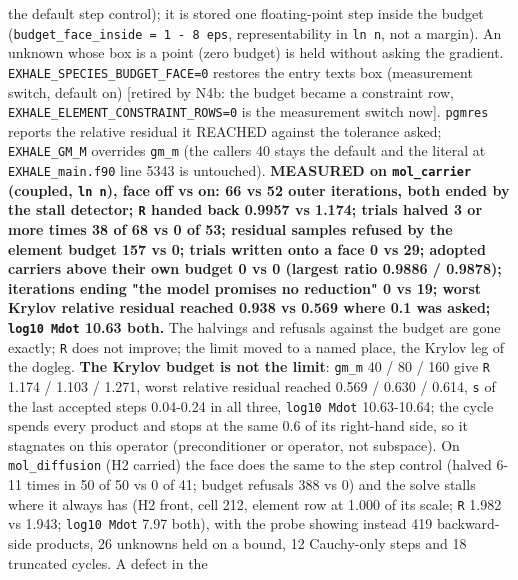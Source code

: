 \documentclass[english,a4paper]{my_memo}
\begin{document}
\begin{itemize}
  the default step control); it is stored one floating-point step inside
  the budget (\texttt{budget\_face\_inside\ =\ 1\ -\ 8\ eps}, representability in \texttt{ln\ n},
  not a margin). An unknown whose box is a point (zero budget) is held
  without asking the gradient. \texttt{EXHALE\_SPECIES\_BUDGET\_FACE=0} restores the
  entry text\textquotesingle s box (measurement switch, default on) {[}retired by N4b: the
  budget became a constraint row, \texttt{EXHALE\_ELEMENT\_CONSTRAINT\_ROWS=0} is the
  measurement switch now{]}. \texttt{pgmres} reports the
  relative residual it REACHED against the tolerance asked; \texttt{EXHALE\_GM\_M}
  overrides \texttt{gm\_m} (the caller\textquotesingle s 40 stays the default and the literal at
  \texttt{EXHALE\_main.f90} line 5343 is untouched). \textbf{MEASURED on \texttt{mol\_carrier}
  (coupled, \texttt{ln\ n}), face off vs on: 66 vs 52 outer iterations, both ended
  by the stall detector; \texttt{\textbar{}\textbar{}R\textbar{}\textbar{}} handed back 0.9957 vs 1.174; trials halved
  3 or more times 38 of 68 vs 0 of 53; residual samples refused by the
  element budget 157 vs 0; trials written onto a face 0 vs 29; adopted
  carriers above their own budget 0 vs 0 (largest ratio 0.9886 / 0.9878);
  iterations ending "the model promises no reduction" 0 vs 19; worst Krylov
  relative residual reached 0.938 vs 0.569 where 0.1 was asked; \texttt{log10\ Mdot} 10.63 both.} The halvings and refusals against the budget are gone
  exactly; \texttt{\textbar{}\textbar{}R\textbar{}\textbar{}} does not improve; the limit moved to a named place, the
  Krylov leg of the dogleg. \textbf{The Krylov budget is not the limit}: \texttt{gm\_m}
  40 / 80 / 160 give \texttt{\textbar{}\textbar{}R\textbar{}\textbar{}} 1.174 / 1.103 / 1.271, worst relative residual
  reached 0.569 / 0.630 / 0.614, \texttt{\textbar{}\textbar{}s\textbar{}\textbar{}} of the last accepted steps
  0.04-0.24 in all three, \texttt{log10\ Mdot} 10.63-10.64; the cycle spends every
  product and stops at the same 0.6 of its right-hand side, so it stagnates
  on this operator (preconditioner or operator, not subspace). On
  \texttt{mol\_diffusion} (H2 carried) the face does the same to the step control
  (halved 6-11 times in 50 of 50 vs 0 of 41; budget refusals 388 vs 0) and
  the solve stalls where it always has (H2 front, cell 212, element row at
  1.000 of its scale; \texttt{\textbar{}\textbar{}R\textbar{}\textbar{}} 1.982 vs 1.943; \texttt{log10\ Mdot} 7.97 both), with
  the probe showing instead 419 backward-side products, 26 unknowns held on
  a bound, 12 Cauchy-only steps and 18 truncated cycles. A defect in the

\end{itemize}
\end{document}
